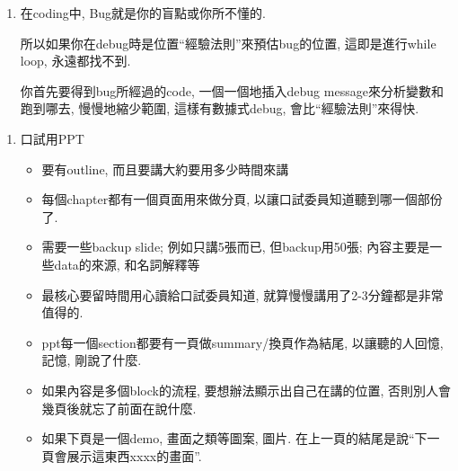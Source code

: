 \begin{enumerate}
  \item
  {
    在coding中, Bug就是你的盲點或你所不懂的.

    所以如果你在debug時是位置``經驗法則''來預估bug的位置, 這即是進行while loop, 永遠都找不到.

    你首先要得到bug所經過的code, 一個一個地插入debug message來分析變數和跑到哪去, 慢慢地縮少範圍, 這樣有數據式debug, 會比``經驗法則''來得快.
  } %
\end{enumerate}


\begin{enumerate}
  \item
  {
    口試用PPT
    \begin{itemize}
      \item
      {
        要有outline, 而且要講大約要用多少時間來講
      } %

      \item
      {
        每個chapter都有一個頁面用來做分頁, 以讓口試委員知道聽到哪一個部份了.
      } %

      \item
      {
        需要一些backup slide; 例如只講5張而已, 但backup用50張; 內容主要是一些data的來源, 和名詞解釋等
      } %

      \item
      {
        最核心要留時間用心讀給口試委員知道, 就算慢慢講用了2-3分鐘都是非常值得的.
      } %

      \item
      {
        ppt每一個section都要有一頁做summary/換頁作為結尾, 以讓聽的人回憶, 記憶, 剛說了什麼.
      } %

      \item
      {
        如果內容是多個block的流程, 要想辦法顯示出自己在講的位置, 否則別人會幾頁後就忘了前面在說什麼.
      } %

      \item
      {
        如果下頁是一個demo, 畫面之類等圖案, 圖片. 在上一頁的結尾是說``下一頁會展示這東西xxxx的畫面''.
      } %


\end{itemize}}
\end{enumerate}

